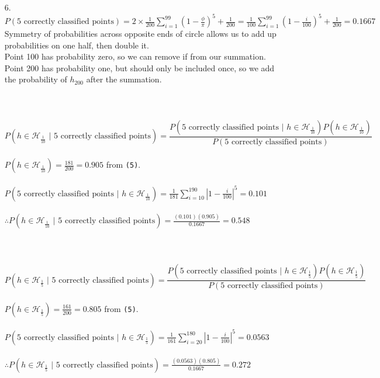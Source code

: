 \documentclass{article}
\begin{document}
\begin{enumerate}
\item[6.]
	$P(\text{5 correctly classified points}) = 2 \times\frac{1}{200} \displaystyle\sum_{i=1}^{99}{\left(1 - \frac{\phi}{\pi}\right)^5 + \frac{1}{200}}  = \frac{1}{100} \displaystyle\sum_{i=1}^{99}{\left(1 - \frac{i}{100}\right)^5 + \frac{1}{200}} = 0.1667$\\
	 Symmetry of probabilities across opposite ends of circle allows us to add up probabilities on one half, then double it.\\
	 Point 100 has probability zero, so we can remove if from our summation.\\
	 Point 200 has probability one, but should only be included once, so we add the probability of $h_{200}$ after the summation.\\ 
	 \bigskip\\
	 \bigskip\\
	 \bigskip\\	
	 $P(h \in  \mathcal{H}_\frac{1}{10} \text{ | 5 correctly classified points} ) = \dfrac{P(\text{5 correctly classified points | } h \in  \mathcal{H}_\frac{1}{10} )P(h \in  \mathcal{H}_\frac{1}{10})}{P(\text{5 correctly classified points})}$\\
	 \medskip\\
	 $P(h \in  \mathcal{H}_\frac{1}{10}) = \frac{181}{200} = 0.905$ from \texttt{(5)}.\\
	 \medskip\\
	 $P(\text{5 correctly classified points | } h \in  \mathcal{H}_\frac{1}{10})  = \frac{1}{181}{\displaystyle\sum_{i=10}^{190}{\left|1 - \frac{i}{100}\right|^5}} = 0.101$\\
	 \medskip\\
	 $\therefore P(h \in  \mathcal{H}_\frac{1}{10} \text{ | 5 correctly classified points} ) = \frac{(0.101)(0.905)}{0.1667}  = 0.548$\\
	 \bigskip\\
	 \bigskip\\
	 \bigskip\\	 
	 $P(h \in  \mathcal{H}_\frac{1}{5} \text{ | 5 correctly classified points} ) = \dfrac{P(\text{5 correctly classified points | } h \in  \mathcal{H}_\frac{1}{5} )P(h \in  \mathcal{H}_\frac{1}{5})}{P(\text{5 correctly classified points})}$\\
	\medskip\\
	$P(h \in  \mathcal{H}_\frac{1}{5}) = \frac{161}{200} = 0.805$ from \texttt{(5)}.\\
	\medskip\\
	$P(\text{5 correctly classified points | } h \in  \mathcal{H}_\frac{1}{5})  = \frac{1}{161}{\displaystyle\sum_{i=20}^{180}{\left|1 - \frac{i}{100}\right|^5}} = 0.0563$\\
	\medskip\\
	$\therefore P(h \in  \mathcal{H}_\frac{1}{5} \text{ | 5 correctly classified points} ) = \frac{(0.0563)(0.805)}{0.1667}  = 0.272$\\


\end{enumerate}
\end{document}
